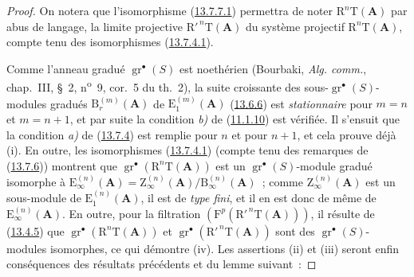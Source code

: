 \begin{proof}
On notera que l'isomorphisme (\hyperref[0.13.7.7.1-fr]{13.7.7.1})
permettra de noter $\mathrm R^n\mathrm T(\mathbf A)$ par abus de langage, la
limite projective $\mathrm R'^{\,n}\mathrm T(\mathbf A)$ du système projectif
$\mathrm R^n\mathrm T(\mathbf A)$, compte tenu des isomorphismes
(\hyperref[0.13.7.4.1-fr]{13.7.4.1}).

Comme l'anneau gradué $\operatorname{gr}^\bullet(S)$ est noethérien
(Bourbaki, \emph{Alg. comm.}, chap.~III, \S~2, n\textsuperscript{o}~9,
cor.~5 du th.~2), la suite croissante des sous-$\operatorname{gr}^\bullet(S)$-%
modules gradués $\mathrm B_r^{(m)}(\mathbf A)$ de
$\mathrm E_1^{(m)}(\mathbf A)$ (\hyperref[0.13.6.6-fr]{13.6.6}) est
\emph{stationnaire} pour $m=n$ et $m=n+1$, et par suite la condition \emph{b)} de
(\hyperref[0.11.1.10-fr]{11.1.10}) est vérifiée. Il s'ensuit que la condition
\emph{a)} de (\hyperref[0.13.7.4-fr]{13.7.4}) est remplie pour $n$ et pour $n+1$,
et cela prouve déjà (i). En outre, les isomorphismes
(\hyperref[0.13.7.4.1-fr]{13.7.4.1}) (compte tenu des remarques de
(\hyperref[0.13.7.6-fr]{13.7.6})) montrent que
$\operatorname{gr}^\bullet(\mathrm R^n\mathrm T(\mathbf A))$ est un
$\operatorname{gr}^\bullet(S)$-module gradué isomorphe à
$\mathrm E_\infty^{(n)}(\mathbf A)=
\mathrm Z_\infty^{(n)}(\mathbf A)/\mathrm B_\infty^{(n)}(\mathbf A)$~;
comme $\mathrm Z_\infty^{(n)}(\mathbf A)$ est un sous-module de
$\mathrm E_1^{(n)}(\mathbf A)$, il est de \emph{type fini}, et il en est donc de
même de $\mathrm E_\infty^{(n)}(\mathbf A)$. En outre, pour la filtration
$(\mathrm F^p(\mathrm R'^{\,n}\mathrm T(\mathbf A)))$, il résulte de
(\hyperref[0.13.4.5-fr]{13.4.5}) que
$\operatorname{gr}^\bullet(\mathrm R^n\mathrm T(\mathbf A))$ et
$\operatorname{gr}^\bullet(\mathrm R'^{\,n}\mathrm T(\mathbf A))$ sont des
$\operatorname{gr}^\bullet(S)$-modules isomorphes, ce qui démontre (iv). Les
assertions (ii) et (iii) seront enfin conséquences des résultats précédents
et du lemme suivant~:
\end{proof}

